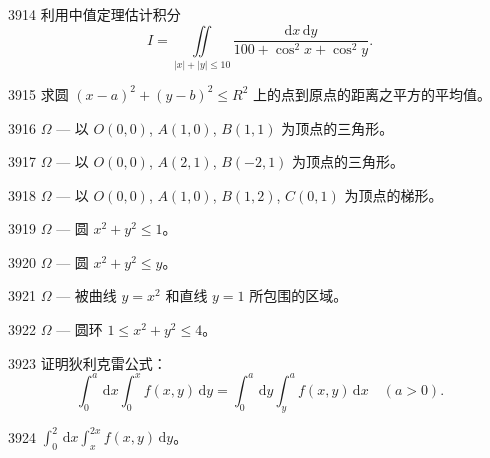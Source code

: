 \begin{prob}[M]{3914}
利用中值定理估计积分
\[
I = \iint\limits_{|x| + |y| \leqslant 10} \frac{\mathrm{d}x\,\mathrm{d}y}{100 + \cos^2 x + \cos^2 y}.
\]
\end{prob}

\begin{prob}[M]{3915}
求圆 $(x - a)^2 + (y - b)^2 \leqslant R^2$ 上的点到原点的距离之平方的平均值。
\end{prob}


\begin{prob}[S]{3916}
$\Omega$ — 以 $O(0, 0)$, $A(1, 0)$, $B(1, 1)$ 为顶点的三角形。
\end{prob}

\begin{prob}[S]{3917}
$\Omega$ — 以 $O(0, 0)$, $A(2, 1)$, $B(-2, 1)$ 为顶点的三角形。
\end{prob}

\begin{prob}[S]{3918}
$\Omega$ — 以 $O(0, 0)$, $A(1, 0)$, $B(1, 2)$, $C(0, 1)$ 为顶点的梯形。
\end{prob}

\begin{prob}[S]{3919}
$\Omega$ — 圆 $x^2 + y^2 \leqslant 1$。
\end{prob}

\begin{prob}[S]{3920}
$\Omega$ — 圆 $x^2 + y^2 \leqslant y$。
\end{prob}

\begin{prob}[S]{3921}
$\Omega$ — 被曲线 $y = x^2$ 和直线 $y = 1$ 所包围的区域。
\end{prob}

\begin{prob}[S]{3922}
$\Omega$ — 圆环 $1 \leqslant x^2 + y^2 \leqslant 4$。
\end{prob}

\begin{prob}[M]{3923}
证明狄利克雷公式：
\[
\int_{0}^{a}\,\mathrm{d}x \int_{0}^{x} f(x, y)\,\mathrm{d}y = \int_{0}^{a}\,\mathrm{d}y \int_{y}^{a} f(x, y)\,\mathrm{d}x \quad (a > 0).
\]
\end{prob}


\begin{prob}[S]{3924}
$\int_{0}^{2}\,\mathrm{d}x \int_{x}^{2x} f(x, y)\,\mathrm{d}y$。
\end{prob}

